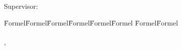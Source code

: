 \begin{titlepage}
Supervisor:
\begin{tabbing}
\quad\=Formel\quad\= Formel\quad\= Formel\quad\= Formel\quad\= Formel\quad\= Formel \quad\= Formel\quad\= Formel\kill  
\myFirstReviewer\\
\myFirstSupervisor\\
\ifdefempty{\mySecondReviewer}{\\}{\mySecondReviewer\\}
\ifdefempty{\mySecondSupervisor}{\\}{\mySecondSupervisor}
\ifdefempty{\myThirdSupervisor}{}{\myThirdSupervisor} \>\>\>\>\>\>\> \myLocation, \myCreationDate
\end{tabbing}
\normalsize
\vfill








\end{titlepage}
